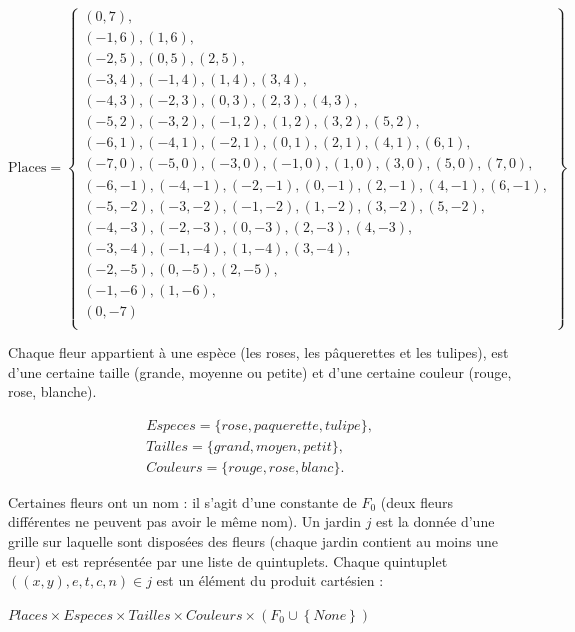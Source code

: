 \documentclass{article}
\theoremstyle{plain}
\theoremstyle{remark}
\begin{document}
\[
\mathrm{Places}  = \left \{
\begin{array}{c}
(0,7) ,
\\
(-1,6), (1,6) ,
\\
(-2,5) , (0,5) , (2,5),
\\
(-3,4) , (-1,4) , (1,4) , (3,4),
\\
(-4,3), (-2,3), (0,3) , (2,3), (4,3),
\\
(-5,2),(-3,2) , (-1,2) , (1,2) , (3,2), (5,2),
\\
(-6,1),(-4,1), (-2,1), (0,1) , (2,1) , (4,1),(6,1),
\\
(-7,0) , (-5,0) , (-3,0) , (-1,0) , (1,0) , (3,0) , (5,0) , (7,0) ,
\\
(-6,-1),(-4,-1), (-2,-1), (0,-1) , (2,-1), (4,-1),(6,-1),
\\
(-5,-2),(-3,-2), (-1,-2), (1,-2) , (3,-2),(5,-2),
\\
(-4,-3), (-2,-3) , (0,-3) , (2,-3), (4,-3),
\\
(-3,-4), (-1,-4), (1,-4) , (3,-4) ,
\\
(-2,-5) , (0,-5) , (2,-5),
\\
(-1,-6),  (1,-6),
\\
(0,-7)
\\
\end{array}
\right \}
\]

Chaque fleur appartient à une espèce (les roses, les pâquerettes et
les tulipes), est d'une certaine taille (grande, moyenne ou petite) et
d'une certaine couleur (rouge, rose, blanche).

 \[ \begin{array}{l}
   Especes =  \{rose, paquerette,tulipe \}, \\
   Tailles =  \{grand, moyen, petit \},\\
   Couleurs = \{rouge,rose, blanc \}.
\end{array}
\]

Certaines fleurs ont un nom : il s'agit d'une constante de $F_0$ (deux
fleurs différentes ne peuvent pas avoir le même nom). Un jardin $j$
est la donnée d'une grille sur laquelle sont disposées des fleurs
(chaque jardin contient au moins une fleur) et est représentée par une
liste de quintuplets. Chaque quintuplet $((x, y), e, t, c, n) \in j$
est un élément du produit cartésien :

 \begin{center}
 $Places \times Especes \times Tailles \times Couleurs \times(F_0 \cup \left \{None\right \})$ 
 \end{center}
 
\end{document}
